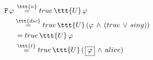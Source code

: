 \documentclass[11pt]{article}
\begin{document}
$\begin{aligned}
     \tt{F}\,\varphi &\,\overset{\ttt{n}}{=} true\,\ttt{U}\,\varphi \\
     &\overset{\ttt{dsc}}{=} true\,\ttt{U}\,(\varphi\,\land\,(true\,\lor\, sing)) \\
     &\,= true\,\ttt{U}\,\varphi \\
     &\,\overset{\ttt{t}}{=} true\,\ttt{U}\,(\,\boxed\varphi\,\land\,alive)
\end{aligned}$
\end{document}
